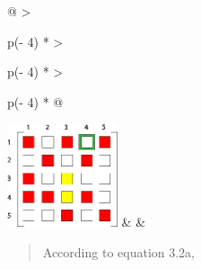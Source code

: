 \begin{longtable}[]{@{}
  >{\raggedright\arraybackslash}p{(\columnwidth - 4\tabcolsep) * }
  >{\raggedright\arraybackslash}p{(\columnwidth - 4\tabcolsep) * }
  >{\raggedright\arraybackslash}p{(\columnwidth - 4\tabcolsep) * }@{}}
\toprule
\includegraphics[width=1.28055in,height=1.19882in]{./Scheduler/media/image34.png}
& & \begin{minipage}[b]{\linewidth}\raggedright
\begin{quote}
According to equation 3.2a,
\end{quote}
\end{minipage} \\
\midrule


\end{longtable}
